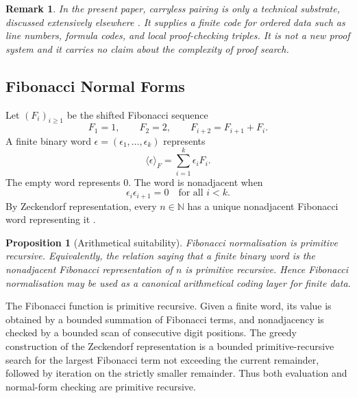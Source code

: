 \documentclass[letterpaper,10pt]{article}
\makeatletter
\theoremstyle{upright}
\theoremstyle{upright}
\newtheorem{remark}[theorem]{Remark}
\newtheorem{proposition}[theorem]{Proposition}
\renewenvironment{proof}[1][Proof]{%
	\par\pushQED{\qed}%
	\normalfont
	\topsep6\p@\@plus6\p@\relax
	\trivlist
	\item[\hskip\labelsep\slshape #1\@addpunct{.}]%
}{%
	\popQED\endtrivlist\@endpefalse
}
\makeatother
\begin{document}
\begin{remark}
	In the present paper, carryless pairing is only a technical substrate, discussed extensively elsewhere \citep{rosko2026carryless}. It supplies a finite code for ordered data such as line numbers, formula codes, and local proof-checking triples. It is not a new proof system and it carries no claim about the complexity of proof search.
\end{remark}

\subsection{Fibonacci Normal Forms}\label{subsec:fibonacci-normal-forms}

Let $(F_i)_{i\geq 1}$ be the shifted Fibonacci sequence
\begin{equation}
	F_1=1,\qquad F_2=2,\qquad F_{i+2}=F_{i+1}+F_i.
\end{equation}
A finite binary word $\epsilon=(\epsilon_1,\ldots,\epsilon_k)$ represents
\begin{equation}
	\langle\epsilon\rangle_F=\sum_{i=1}^{k}\epsilon_iF_i.
\end{equation}
The empty word represents $0$. The word is nonadjacent when
\begin{equation}
	\epsilon_i\epsilon_{i+1}=0\quad\text{for all }i<k.
\end{equation}
By Zeckendorf representation, every $n\in\mathbb{N}$ has a unique nonadjacent Fibonacci word representing it \citep{zeckendorf}.

\begin{proposition}[Arithmetical suitability]
	Fibonacci normalisation is primitive recursive. Equivalently, the relation saying that a finite binary word is the nonadjacent Fibonacci representation of $n$ is primitive recursive. Hence Fibonacci normalisation may be used as a canonical arithmetical coding layer for finite data.
\end{proposition}

\begin{proof}
	The Fibonacci function is primitive recursive. Given a finite word, its value is obtained by a bounded summation of Fibonacci terms, and nonadjacency is checked by a bounded scan of consecutive digit positions. The greedy construction of the Zeckendorf representation is a bounded primitive-recursive search for the largest Fibonacci term not exceeding the current remainder, followed by iteration on the strictly smaller remainder. Thus both evaluation and normal-form checking are primitive recursive.
\end{proof}
\end{document}
